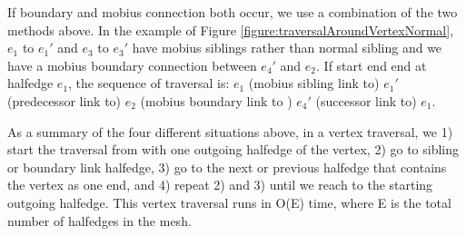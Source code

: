 \documentclass[12pt]{article}
\begin{document}
If boundary and mobius connection both occur, we use a combination of the two methods above. In the example of Figure \ref{figure:traversalAroundVertexNormal}, $e_1$ to $e_1'$ and $e_3$ to $e_3'$ have mobius siblings rather than normal sibling and we have a mobius boundary connection between $e_4'$ and $e_2$. If start end end at halfedge $e_1$, the sequence of traversal is: $e_1$ (mobius sibling link to) $e_1'$ (predecessor link to) $e_2$ (mobius boundary link to ) $e_4'$  (successor link to)  $e_1$.

As a summary of the four different situations above, in a vertex traversal, we 1) start the traversal from with one outgoing halfedge of the vertex, 2) go to sibling or boundary link halfedge, 3) go to the next or previous halfedge that contains the vertex as one end, and 4) repeat 2) and 3) until we reach to the starting outgoing halfedge. This vertex traversal runs in O(E) time, where E is the total number of halfedges in the mesh.
\end{document}
